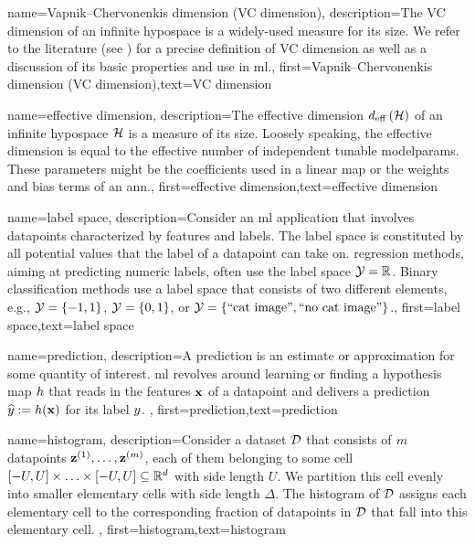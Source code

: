 {name={Vapnik–Chervonenkis dimension (VC dimension)},
	description={The VC dimension of an infinite \gls{hypospace} is a widely-used measure 
		for its size. We refer to the literature (see \cite{ShalevMLBook}) for a precise definition of VC dimension 
		as well as a discussion of its basic properties and use in \gls{ml}.},
	first={Vapnik–Chervonenkis dimension (VC dimension)},text={VC dimension}  
}

{name={effective dimension},
	description={The effective dimension $d_{\rm eff} \left( \mathcal{H} \right)$ of 
		an infinite \gls{hypospace} $\mathcal{H}$ is a measure of its size. Loosely speaking, the 
		effective dimension is equal to the effective number of independent tunable \gls{modelparams}. 
		These \gls{parameters} might be the coefficients used in a linear map or the 
		\gls{weights} and bias terms of an \gls{ann}.},
	first={effective dimension},text={effective dimension}  
}

{name={label space},
	description={Consider an \gls{ml} application that involves \gls{datapoint}s characterized by \gls{feature}s 
		and \gls{label}s. The \gls{label} space is constituted by all potential values that the \gls{label} 
		of a \gls{datapoint} can take on. \Gls{regression} methods, aiming at predicting numeric \gls{label}s, often
		 use the \gls{label} space $\mathcal{Y} = \mathbb{R}$. Binary \gls{classification} methods use a \gls{label} space 
 		that consists of two different elements, e.g., $\mathcal{Y} =\{-1,1\}$, $\mathcal{Y}=\{0,1\}$, 
		or $\mathcal{Y} = \{ \mbox{``cat image''}, \mbox{``no cat image''} \}$.}, first={label space},text={label space}  
}

{name={prediction},
	description={A prediction is an estimate or approximation for some 
		quantity of interest. \Gls{ml} revolves around learning or finding a \gls{hypothesis} map $h$ 
		that reads in the \gls{feature}s ${\bf x}$ of a \gls{datapoint} and delivers a prediction 
		$\widehat{y} := h({\bf x})$ for its \gls{label} $y$. },
	first={prediction},text={prediction}  
}


{name={histogram},
	description={Consider a \gls{dataset} $\mathcal{D}$ that consists of $m$ \gls{datapoint}s 
		${\bf z}^{(1)},\ldots,{\bf z}^{(m)}$, each of them belonging to some 
		cell $[-U,U] \times \ldots \times [-U,U] \subseteq \mathbb{R}^{d}$ with side 
		length $U$. We partition this cell evenly into smaller elementary cells with side 
		length $\Delta$. The histogram of $\mathcal{D}$ assigns each elementary cell to 
		the corresponding fraction of \gls{datapoint}s in $\mathcal{D}$ that fall into this 
		elementary cell. 
	},
	first={histogram},text={histogram}  
}

